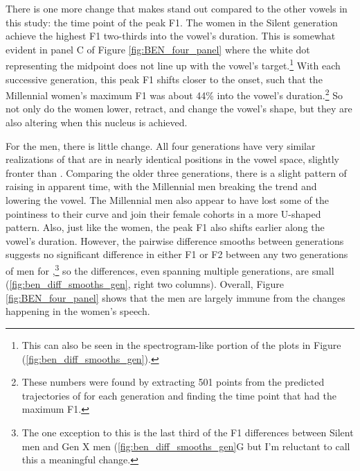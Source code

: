 There is one more change that makes \ben stand out compared to the other vowels in this study: the time point of the peak F1. The women in the Silent generation achieve the highest F1 two-thirds into the vowel's duration. This is somewhat evident in panel C of Figure \ref{fig:BEN_four_panel} where the white dot representing the midpoint does not line up with the vowel's target.\footnote{This can also be seen in the spectrogram-like portion of the plots in Figure  (\ref{fig:ben_diff_smooths_gen}).} With each successive generation, this peak F1 shifts closer to the onset, such that the Millennial women's maximum F1 was about 44\% into the vowel's duration.\footnote{These numbers were found by extracting 501 points from the predicted trajectories of \ben for each generation and finding the time point that had the maximum F1.} So not only do the women lower, retract, and change the vowel's shape, but they are also altering when this nucleus is achieved.

For the men, there is little change. All four generations have very similar realizations of \ben that are in nearly identical positions in the vowel space, slightly fronter than \bet. Comparing the older three generations, there is a slight pattern of \ben raising in apparent time, with the Millennial men breaking the trend and lowering the vowel. The Millennial men also appear to have lost some of the pointiness to their curve and join their female cohorts in a more U-shaped pattern. Also, just like the women, the peak F1 also shifts earlier along the vowel's duration. However, the pairwise difference smooths between generations suggests no significant difference in either F1 or F2 between any two generations of men for \ben,\footnote{The one exception to this is the last third of the F1 differences between Silent men and Gen X men (\ref{fig:ben_diff_smooths_gen}G but I'm reluctant to call this a meaningful change.} so the differences, even spanning multiple generations, are small (\ref{fig:ben_diff_smooths_gen}, right two columns). Overall, Figure \ref{fig:BEN_four_panel} shows that the men are largely immune from the changes happening in the women's speech.

